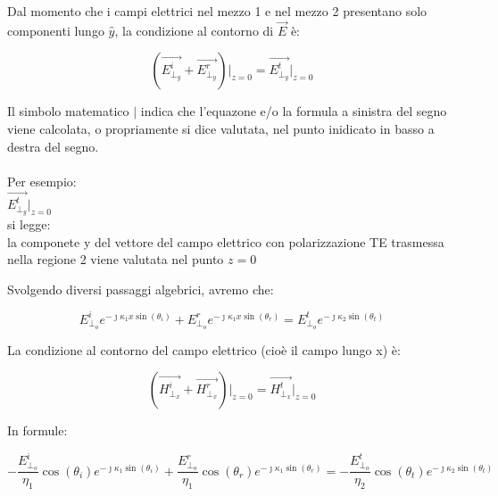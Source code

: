 Dal momento che i campi elettrici nel mezzo 1 e nel mezzo 2 presentano solo componenti 
lungo $\hat{y}$, la condizione al contorno di $\vec{E}$ è: 

{\Large \begin{equation}
    (\vec{E_{\perp_y}^{i}} + \vec{E_{\perp_y}^{r}} )\big|_{z=0} = 
    \vec{E_{\perp_y}^{t}}\big|_{z=0}
\end{equation}} 

\begin{tcolorbox}
    Il simbolo matematico $\big|$ indica che l'equazone e/o la formula a sinistra del segno 
    viene calcolata, o propriamente si dice valutata, nel punto inidicato in basso a destra del segno. \\ \\
    Per esempio: \\ 

    $\vec{E_{\perp_y}^{t}}\big|_{z=0}$ \\ 

    si legge: \\ 
    la componete y del vettore del campo elettrico con polarizzazione TE trasmessa nella regione 2 
    viene valutata nel punto $z=0$ 
\end{tcolorbox}

Svolgendo diversi passaggi algebrici, avremo che: 

{\Large \begin{equation}
    E_{\perp_o}^{i} e^{-\jmath \kappa_1 x \sin(\theta_i)} + E_{\perp_o}^{r} e^{-\jmath \kappa_1 x \sin(\theta_r)} = 
    E_{\perp_o}^{t} e^{-\jmath \kappa_2 \sin(\theta_t)}
\end{equation}}

La condizione al contorno del campo elettrico (cioè il campo lungo x) è: 

{\Large \begin{equation}
    (\vec{H_{\perp_x}^{i}} + \vec{H_{\perp_x}^{r}} )\big|_{z=0} = 
    \vec{H_{\perp_x}^{t}}\big|_{z=0}
\end{equation}} 

In formule: 

{\Large \begin{equation}
    - \frac{E_{\perp_o}^{i}}{\eta_1} \cos(\theta_i) e^{-\jmath \kappa_1 \sin(\theta_i)} + \frac{E_{\perp_o}^{r}}{\eta_1} \cos(\theta_r) e^{-\jmath \kappa_1 \sin(\theta_r)} = 
    - \frac{E_{\perp_o}^{t}}{\eta_2} \cos(\theta_t) e^{-\jmath \kappa_2 \sin(\theta_t)}    
\end{equation}}


